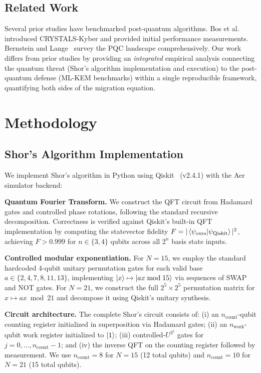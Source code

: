 \documentclass[conference]{IEEEtran}
\begin{document}
\subsection{Related Work}

Several prior studies have benchmarked post-quantum algorithms. Bos et al.~\cite{bos2018} introduced CRYSTALS-Kyber and provided initial performance measurements. Bernstein and Lange~\cite{bernstein2017} survey the PQC landscape comprehensively. Our work differs from prior studies by providing an \emph{integrated} empirical analysis connecting the quantum threat (Shor's algorithm implementation and execution) to the post-quantum defense (ML-KEM benchmarks) within a single reproducible framework, quantifying both sides of the migration equation.

\section{Methodology}
\label{sec:methodology}

\subsection{Shor's Algorithm Implementation}

We implement Shor's algorithm in Python using Qiskit~\cite{qiskit2024} (v2.4.1) with the Aer simulator backend:

\textbf{Quantum Fourier Transform.} We construct the QFT circuit from Hadamard gates and controlled phase rotations, following the standard recursive decomposition. Correctness is verified against Qiskit's built-in QFT implementation by computing the statevector fidelity $F = |\braket{\psi_\text{ours} | \psi_\text{Qiskit}}|^2$, achieving $F > 0.999$ for $n \in \{3, 4\}$ qubits across all $2^n$ basis state inputs.

\textbf{Controlled modular exponentiation.} For $N=15$, we employ the standard hardcoded 4-qubit unitary permutation gates for each valid base $a \in \{2, 4, 7, 8, 11, 13\}$, implementing $\ket{x} \mapsto \ket{ax \bmod 15}$ via sequences of SWAP and NOT gates. For $N=21$, we construct the full $2^5 \times 2^5$ permutation matrix for $x \mapsto ax \bmod 21$ and decompose it using Qiskit's unitary synthesis.

\textbf{Circuit architecture.} The complete Shor's circuit consists of: (i) an $n_\text{count}$-qubit counting register initialized in superposition via Hadamard gates; (ii) an $n_\text{work}$-qubit work register initialized to $\ket{1}$; (iii) controlled-$U^{2^j}$ gates for $j = 0, \ldots, n_\text{count}-1$; and (iv) the inverse QFT on the counting register followed by measurement. We use $n_\text{count} = 8$ for $N=15$ (12 total qubits) and $n_\text{count} = 10$ for $N=21$ (15 total qubits).
\end{document}
